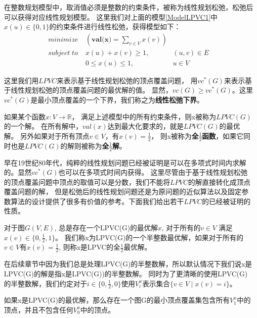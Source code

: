 在整数规划模型中，取消值必须是整数的约束条件，被称为线性规划松弛，松弛后可以获得对应线性规划模型。
这里我们对上面的模型\ref{ModelLPVC1}中$x(u) \in \{0, 1\}$的约束条件进行线性松弛，获得模型如下：
\begin{equation} \begin{aligned}
  minimize\; & (\textbf{val(x)} = \sum_{v \in V}{x(v)}) &\\
  subject\; to\; & x(u) + x(v) \ge 1, &(u, v) \in E \\
   & 0 \le x(u) \le 1, & u \in V
\end{aligned} \end{equation}

这里我们用$LPVC$来表示基于线性规划松弛的顶点覆盖问题，
用$vc^{*}(G)$来表示基于线性规划松弛的顶点覆盖问题的最优解的值。
显然，$vc(G) \ge vc^*(G)$。这里$vc^{*}(G)$是最小顶点覆盖的一个下界，我们称之为\textbf{线性松弛下界}。

如果某个函数$x:V \rightarrow \mathbb{R}$， 满足上述模型中的所有约束条件，则x被称为$LPVC(G)$的一个解。
在所有解中，$val(x)$达到最大化要求的，就是$LPVC(G)$的最优解。
另外如果对于所有顶点$v \in V$，有$x(v) = \frac{1}{2}$，
则x被称为\textbf{全$\frac{1}{2}$函数}，如果它同时也是$LPVC(G)$的解则被称为\textbf{全$\frac{1}{2}$解}。



早在19世纪80年代，纯粹的线性规划问题已经被证明是可以在多项式时间内求解的\cite{khachiian1979polynomial}。显然$vc^{*}(G)$也可以在多项式时间内获得。
这里尽管由于基于线性规划松弛的顶点覆盖问题中顶点的取值可以是分数，我们不能将$LPVC$的解直接转化成顶点覆盖问题的解，
但是松弛后的线性规划问题还是为原问题的近似算法以及固定参数算法的设计提供了很多有价值的参考。下面我们给出若干$LPVC$的已经被证明的性质。
\begin{lemma}
对于图$G(V, E)$, 总是存在一个LPVC(G)的最优解$x$, 对于所有的$v \in V$ 满足$x(v) \in \{0, \frac{1}{2}, 1\}$。
我们称x为LPVC(G)的一个半整数最优解，如果对于所有的$v \in V$有$x(v) = \frac{1}{2}$, 则称x是LPVC的全$\frac{1}{2}$最优解。
\end{lemma}

在后续章节中因为我们总是处理LPVC(G)的半整数解，所以默认情况下我们说x是LPVC(G)的解是指x是LPVC(G))的半整数解。
同时为了更清晰的使用LPVC(G)的半整数解，我们约定对于$i \in \{0, \frac{1}{2}, 0\}$使用$V^x_i$表示集合$\{v \in V\;|\; x(v) = i\}$。

\begin{lemma}\label{relationBwtVCAndLPVC}
如果x是LPVC(G)的最优解，那么存在一个图G的最小顶点覆盖集包含所有$V^x_1$中的顶点，并且不包含任何$V^x_0$中的顶点。
\end{lemma}

